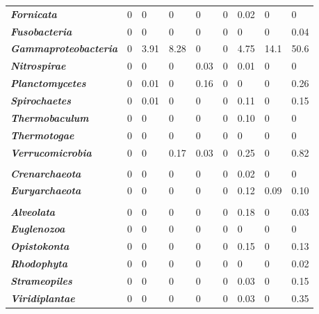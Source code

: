 \begin{table}
\begin{tabularx}{\textwidth}{p{3.5cm}p{0.6cm}p{0.8cm}p{0.8cm}p{0.6cm}p{0.5cm}p{1cm}XX}
\textbf{\emph{Fornicata}} & 0 & 0 & 0 & 0 & 0 & 0.02 & 0 & 0 \\
\textbf{\emph{Fusobacteria}} & 0 & 0 & 0 & 0 & 0 & 0 & 0 & 0.04 \\
\textbf{\emph{Gammaproteobacteria}} & 0 & \cellcolor{blue!25}3.91 & \cellcolor{blue!25}8.28 & 0 & 0 & 4.75 & \cellcolor{blue!25}14.1 & \cellcolor{blue!25}50.6 \\
\textbf{\emph{Nitrospirae}} & 0 & 0 & 0 & 0.03 & 0 & 0.01 & 0 & 0 \\
\textbf{\emph{Planctomycetes}} & 0 & 0.01 & 0 & 0.16 & 0 & 0 & 0 & 0.26 \\
\textbf{\emph{Spirochaetes}} & 0 & 0.01 & 0 & 0 & 0 & 0.11 & 0 & 0.15 \\
\textbf{\emph{Thermobaculum}} & 0 & 0 & 0 & 0 & 0 & 0.10 & 0 & 0 \\
\textbf{\emph{Thermotogae}} & 0 & 0 & 0 & 0 & 0 & 0 & 0 & 0 \\
\textbf{\emph{Verrucomicrobia}} & 0 & 0 & 0.17 & 0.03 & 0 & 0.25 & 0 & 0.82 \\
 &  &  &  &  &  &  &  &  \\
\textbf{\emph{Crenarchaeota}} & 0 & 0 & 0 & 0 & 0 & 0.02 & 0 & 0 \\
\textbf{\emph{Euryarchaeota}} & 0 & 0 & 0 & 0 & 0 & 0.12 & 0.09 & 0.10 \\
 &  &  &  &  &  &  &  &  \\
\textbf{\emph{Alveolata}} & 0 & 0 & 0 & 0 & 0 & 0.18 & 0 & 0.03 \\
\textbf{\emph{Euglenozoa}} & 0 & 0 & 0 & 0 & 0 & 0 & 0 & 0 \\
\textbf{\emph{Opistokonta}} & 0 & 0 & 0 & 0 & 0 & 0.15 & 0 & 0.13 \\
\textbf{\emph{Rhodophyta}} & 0 & 0 & 0 & 0 & 0 & 0 & 0 & 0.02 \\
\textbf{\emph{Strameopiles}} & 0 & 0 & 0 & 0 & 0 & 0.03 & 0 & 0.15 \\
\textbf{\emph{Viridiplantae}} & 0 & 0 & 0 & 0 & 0 & 0.03 & 0 & 0.35 \\
\bottomrule
\end{tabularx}
\end{table}


